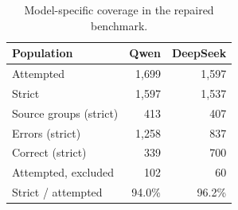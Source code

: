 \begin{table}[t]
\centering\small
\caption{Model-specific coverage in the repaired benchmark.}
\label{tab:coverage}
\setlength{\tabcolsep}{4pt}
\begin{tabular}{@{}lrr@{}}
\toprule
Population & Qwen & DeepSeek\\
\midrule
Attempted & 1,699 & 1,597\\
Strict & 1,597 & 1,537\\
Source groups (strict) & 413 & 407\\
Errors (strict) & 1,258 & 837\\
Correct (strict) & 339 & 700\\
Attempted, excluded & 102 & 60\\
Strict / attempted & 94.0\% & 96.2\%\\
\bottomrule
\end{tabular}
\end{table}
